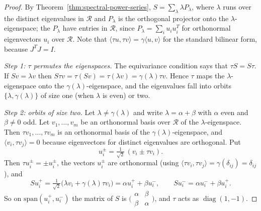 \documentclass[12pt, a4paper]{report}
\theoremstyle{plain}
\theoremstyle{definition}
\theoremstyle{remark}
\theoremstyle{plain}
\DeclareMathOperator{\diag}{diag}
\begin{document}
\begin{proof}
By Theorem~\ref{thm:spectral-power-series}, $S=\sum_\lambda\lambda P_\lambda$, where $\lambda$ runs over the distinct eigenvalues in $\mathcal R$ and $P_\lambda$ is the orthogonal projector onto the $\lambda$-eigenspace; the $P_\lambda$ have entries in $\mathcal R$, since $P_\lambda=\sum_iu_iu_i^T$ for orthonormal eigenvectors $u_i$ over $\mathcal R$. Note that $\langle\tau u,\tau v\rangle=\gamma\langle u,v\rangle$ for the standard bilinear form, because $J^TJ=I$.

\emph{Step 1: $\tau$ permutes the eigenspaces.} The equivariance condition says that $\tau S=S\tau$. If $Sv=\lambda v$ then $S\tau v=\tau(Sv)=\tau(\lambda v)=\gamma(\lambda)\tau v$. Hence $\tau$ maps the $\lambda$-eigenspace onto the $\gamma(\lambda)$-eigenspace, and the eigenvalues fall into orbits $\{\lambda,\gamma(\lambda)\}$ of size one (when $\lambda$ is even) or two.

\emph{Step 2: orbits of size two.} Let $\lambda\neq\gamma(\lambda)$ and write $\lambda=\alpha+\beta$ with $\alpha$ even and $\beta\neq0$ odd. Let $v_1,\dots,v_m$ be an orthonormal basis over $\mathcal R$ of the $\lambda$-eigenspace. Then $\tau v_1,\dots,\tau v_m$ is an orthonormal basis of the $\gamma(\lambda)$-eigenspace, and $\langle v_i,\tau v_j\rangle=0$ because eigenvectors for distinct eigenvalues are orthogonal. Put
\[ u_i^{\pm}=\tfrac{1}{\sqrt2}\,(v_i\pm\tau v_i). \]
Then $\tau u_i^\pm=\pm u_i^\pm$, the vectors $u_i^\pm$ are orthonormal (using $\langle\tau v_i,\tau v_j\rangle=\gamma(\delta_{ij})=\delta_{ij}$), and
\[ Su_i^+=\tfrac{1}{\sqrt2}\bigl(\lambda v_i+\gamma(\lambda)\tau v_i\bigr)=\alpha u_i^++\beta u_i^-,\qquad Su_i^-=\alpha u_i^-+\beta u_i^+ . \]
So on $\mathrm{span}(u_i^+,u_i^-)$ the matrix of $S$ is $\bigl(\begin{smallmatrix}\alpha&\beta\\\beta&\alpha\end{smallmatrix}\bigr)$, and $\tau$ acts as $\diag(1,-1)$.


\end{proof}
\end{document}
